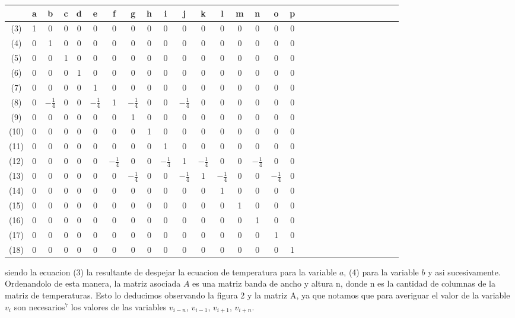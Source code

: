 \begin{center}
   \begin{tabular}{| c | c | c | c | c | c | c | c | c |c | c |c | c |c | c | c | c | c | c | c | c |c | c |c | c |c | c |c | c |}
     \hline
       & a  & b & c & d & e & f & g & h & i & j & k & l & m & n & o & p  \\ \hline
   (3) & 1  & 0 & 0 & 0 & 0 & 0 & 0 & 0 & 0 & 0 & 0 & 0 & 0 & 0 & 0 & 0 \\ \hline
   (4) & 0  & 1 & 0 & 0 & 0 & 0 & 0 & 0 & 0 & 0 & 0 & 0 & 0 & 0 & 0 & 0 \\ \hline
   (5) & 0  & 0 & 1 & 0 & 0 & 0 & 0 & 0 & 0 & 0 & 0 & 0 & 0 & 0 & 0 & 0 \\ \hline
   (6) & 0  & 0 & 0 & 1 & 0 & 0 & 0 & 0 & 0 & 0 & 0 & 0 & 0 & 0 & 0 & 0 \\ \hline
   (7) & 0  & 0 & 0 & 0 & 1 & 0 & 0 & 0 & 0 & 0 & 0 & 0 & 0 & 0 & 0 & 0 \\ \hline
   (8) & 0  & $-\frac{1}{4} $ & 0 & 0 & $-\frac{1}{4} $ & 1 & $-\frac{1}{4} $ & 0 & 0 & $-\frac{1}{4} $& 0 & 0 & 0 & 0 & 0 & 0 \\ \hline
   (9) & 0  & 0 & 0 & 0 & 0 & 0 & 1 & 0 & 0 & 0 & 0 & 0 & 0 & 0 & 0 & 0 \\ \hline
   (10) & 0  & 0 & 0 & 0 & 0 & 0 & 0 & 1 & 0 & 0 & 0 & 0 & 0 & 0 & 0 & 0 \\ \hline
   (11) & 0  & 0 & 0 & 0 & 0 & 0 & 0 & 0 & 1 & 0 & 0 & 0 & 0 & 0 & 0 & 0 \\ \hline
   (12) & 0  & 0 & 0 & 0 & 0 & $-\frac{1}{4} $ & 0 & 0 & $-\frac{1}{4} $ & 1 & $-\frac{1}{4} $ & 0 & 0 & $-\frac{1}{4} $ & 0 & 0 \\ \hline
   (13) & 0  & 0 & 0 & 0 & 0 & 0 & $-\frac{1}{4} $ & 0 & 0 & $-\frac{1}{4} $ & 1 & $-\frac{1}{4} $ & 0 & 0 & $-\frac{1}{4} $ & 0 \\ \hline
   (14) & 0  & 0 & 0 & 0 & 0 & 0 & 0 & 0 & 0 & 0 & 0 & 1 & 0 & 0 & 0 & 0 \\ \hline
   (15) & 0  & 0 & 0 & 0 & 0 & 0 & 0 & 0 & 0 & 0 & 0 & 0 & 1 & 0 & 0 & 0 \\ \hline
   (16) & 0  & 0 & 0 & 0 & 0 & 0 & 0 & 0 & 0 & 0 & 0 & 0 & 0 & 1 & 0 & 0 \\ \hline
   (17) & 0  & 0 & 0 & 0 & 0 & 0 & 0 & 0 & 0 & 0 & 0 & 0 & 0 & 0 & 1 & 0 \\ \hline
   (18) & 0  & 0 & 0 & 0 & 0 & 0 & 0 & 0 & 0 & 0 & 0 & 0 & 0 & 0 & 0 & 1 \\ \hline
   \end{tabular}
\end{center}
siendo la ecuacion (3) la resultante de despejar la ecuacion de temperatura para la variable $a$, (4) para la variable $b$ y asi sucesivamente.
Ordenandolo de esta manera, la matriz asociada $A$ es una matriz banda de ancho y altura n, donde n es la cantidad de columnas 
de la matriz de temperaturas. Esto lo deducimos observando la figura 2 y la matriz A,
ya que notamos que para averiguar el valor de la variable $v_{i}$ son necesarios$^7$ los valores de las variables $v_{i-n}$, $v_{i-1}$, 
$v_{i+1}$, $v_{i+n}$.

